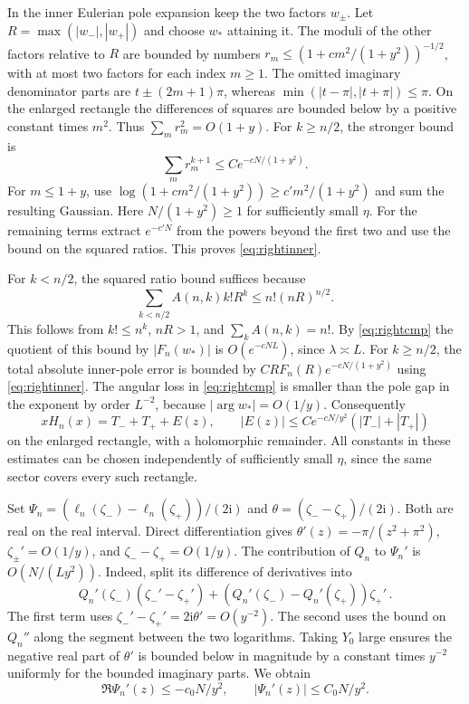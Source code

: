 \documentclass[11pt]{article}
\DeclareMathOperator{\Arg}{arg}
\newcommand{\ii}{\mathrm i}
\begin{document}
In the inner Eulerian pole expansion keep the two factors \(w_\pm\). Let \(R=\max(|w_-|,|w_+|)\) and choose \(w_*\) attaining it. The moduli of the other factors relative to \(R\) are bounded by numbers \(r_m\le(1+c m^2/(1+y^2))^{-1/2}\), with at most two factors for each index \(m\ge1\). The omitted imaginary denominator parts are \(t\pm(2m+1)\pi\), whereas \(\min(|t-\pi|,|t+\pi|)\le\pi\). On the enlarged rectangle the differences of squares are bounded below by a positive constant times \(m^2\). Thus \(\sum_m r_m^2=O(1+y)\). For \(k\ge n/2\), the stronger bound is
\begin{equation}\label{eq:rightinner}
 \sum_m r_m^{k+1}\le C e^{-cN/(1+y^2)}.
\end{equation}
For \(m\le 1+y\), use \(\log(1+c m^2/(1+y^2))\ge c' m^2/(1+y^2)\) and sum the resulting Gaussian. Here \(N/(1+y^2)\ge1\) for sufficiently small \(\eta\). For the remaining terms extract \(e^{-c'N}\) from the powers beyond the first two and use the bound on the squared ratios. This proves \eqref{eq:rightinner}.

For \(k<n/2\), the squared ratio bound suffices because
\[
 \sum_{k<n/2} A(n,k) k!R^k\le n!(nR)^{n/2}.
\]
This follows from \(k!\le n^k\), \(nR>1\), and \(\sum_k A(n,k)=n!\). By \eqref{eq:rightcmp} the quotient of this bound by \(|F_n(w_*)|\) is \(O(e^{-cNL})\), since \(\lambda\asymp L\). For \(k\ge n/2\), the total absolute inner-pole error is bounded by \(C R F_n(R)e^{-cN/(1+y^2)}\) using \eqref{eq:rightinner}. The angular loss in \eqref{eq:rightcmp} is smaller than the pole gap in the exponent by order \(L^{-2}\), because \(|\Arg w_*|=O(1/y)\). Consequently
\begin{equation}\label{eq:righttwo}
 xH_n(x)=T_-+T_++E(z),\qquad
 |E(z)|\le C e^{-cN/y^2}(|T_-|+|T_+|)
\end{equation}
on the enlarged rectangle, with a holomorphic remainder. All constants in these estimates can be chosen independently of sufficiently small \(\eta\), since the same sector covers every such rectangle.

Set \(\Psi_n=(\ell_n(\zeta_-)-\ell_n(\zeta_+))/(2\ii)\) and \(\theta=(\zeta_--\zeta_+)/(2\ii)\). Both are real on the real interval. Direct differentiation gives \(\theta'(z)=-\pi/(z^2+\pi^2)\), \(\zeta_\pm'=O(1/y)\), and \(\zeta_--\zeta_+=O(1/y)\). The contribution of \(Q_n\) to \(\Psi_n'\) is \(O(N/(Ly^2))\). Indeed, split its difference of derivatives into
\[
 Q_n'(\zeta_-)(\zeta_-'-\zeta_+')+
       (Q_n'(\zeta_-)-Q_n'(\zeta_+))\zeta_+'\,.
\]
The first term uses \(\zeta_-'-\zeta_+'=2\ii\theta'=O(y^{-2})\). The second uses the bound on \(Q_n''\) along the segment between the two logarithms. Taking \(Y_0\) large ensures the negative real part of \(\theta'\) is bounded below in magnitude by a constant times \(y^{-2}\) uniformly for the bounded imaginary parts. We obtain
\begin{equation}\label{eq:rightderiv}
 \Re\Psi_n'(z)\le -c_0N/y^2,\qquad |\Psi_n'(z)|\le C_0N/y^2.
\end{equation}
\end{document}
